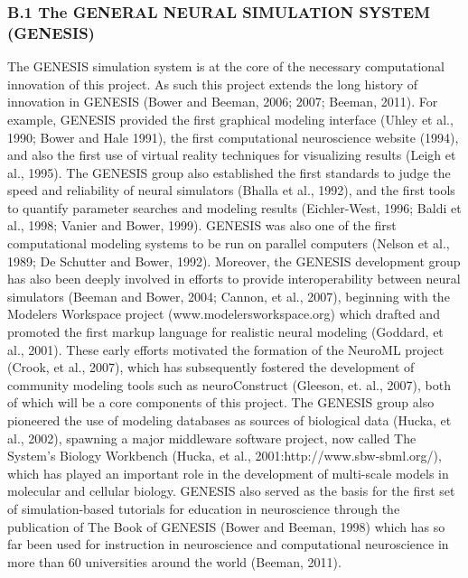 \documentclass[12pt]{article}
\begin{document}
\subsubsection*{B.1 The GENERAL NEURAL SIMULATION SYSTEM (GENESIS)}

\noindent The GENESIS simulation system is at the core of the
necessary computational innovation of this project. As such this
project extends the long history of innovation in GENESIS (Bower and
Beeman, 2006; 2007; Beeman, 2011). For example, GENESIS provided the
first graphical modeling interface (Uhley et al., 1990; Bower and Hale
1991), the first computational neuroscience website (1994), and also
the first use of virtual reality techniques for visualizing results
(Leigh et al., 1995). The GENESIS group also established the first
standards to judge the speed and reliability of neural simulators
(Bhalla et al., 1992), and the first tools to quantify parameter
searches and modeling results (Eichler-West, 1996; Baldi et al., 1998;
Vanier and Bower, 1999). GENESIS was also one of the first
computational modeling systems to be run on parallel computers (Nelson
et al., 1989; De Schutter and Bower, 1992). Moreover, the GENESIS
development group has also been deeply involved in efforts to provide
interoperability between neural simulators (Beeman and Bower, 2004;
Cannon, et al., 2007), beginning with the Modelers Workspace project
(www.modelersworkspace.org) which drafted and promoted the first
markup language for realistic neural modeling (Goddard, et al., 2001).
These early efforts motivated the formation of the NeuroML project
(Crook, et al., 2007), which has subsequently fostered the development
of community modeling tools such as neuroConstruct (Gleeson, et. al.,
2007), both of which will be a core components of this project. The
GENESIS group also pioneered the use of modeling databases as sources
of biological data (Hucka, et al., 2002), spawning a major middleware
software project, now called The System's Biology Workbench (Hucka, et
al., 2001:http://www.sbw-sbml.org/), which has played an important
role in the development of multi-scale models in molecular and
cellular biology. GENESIS also served as the basis for the first set
of simulation-based tutorials for education in neuroscience through
the publication of The Book of GENESIS (Bower and Beeman, 1998) which
has so far been used for instruction in neuroscience and computational
neuroscience in more than 60 universities around the world (Beeman,
2011). %
\end{document}
